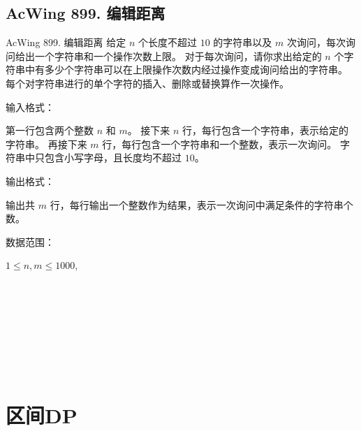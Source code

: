 \subsection{AcWing 899. 编辑距离}
\begin{titledbox}{AcWing 899. 编辑距离}
    给定 $n$ 个长度不超过 $10$ 的字符串以及 $m$ 次询问，每次询问给出一个字符串和一个操作次数上限。 对于每次询问，请你求出给定的 $n$ 个字符串中有多少个字符串可以在上限操作次数内经过操作变成询问给出的字符串。 每个对字符串进行的单个字符的插入、删除或替换算作一次操作。

    输入格式：

    第一行包含两个整数 $n$ 和 $m$。 接下来 $n$ 行，每行包含一个字符串，表示给定的字符串。 再接下来 $m$ 行，每行包含一个字符串和一个整数，表示一次询问。 字符串中只包含小写字母，且长度均不超过 $10$。

    输出格式：

    输出共 $m$ 行，每行输出一个整数作为结果，表示一次询问中满足条件的字符串个数。

    数据范围：

    $1 \le n, m \le 1000$,

    \begin{inputblock}
         \\
         \\
         \\
         \\
         \\
    \end{inputblock}
    \begin{outputblock}
         \\
    \end{outputblock}
\end{titledbox}


\section{区间DP}

